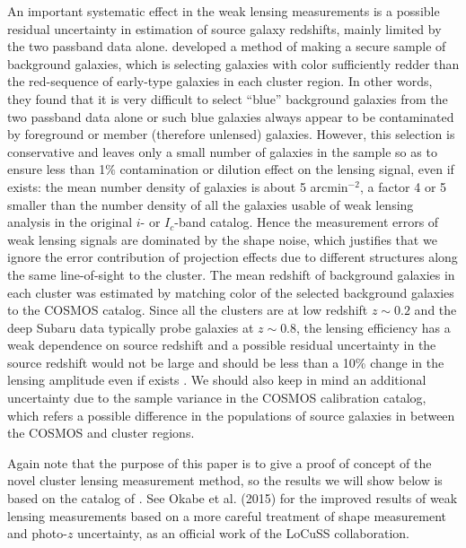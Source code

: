 \documentclass[iop, apj]{emulateapj}
\newcommand{\?}{\stackrel{?}{=}}
\begin{document}
An important systematic effect in the weak lensing measurements is a
possible residual uncertainty in estimation of source galaxy redshifts,
mainly limited by the two passband data alone. \citet{Okabeetal:13}
developed a method of making a secure sample of background galaxies,
which is selecting galaxies with color sufficiently redder than the
red-sequence of early-type galaxies in each cluster region. In other
words, they found that it is very difficult to select ``blue''
background galaxies from the two passband data alone or such blue
galaxies always appear to be contaminated by foreground or member
(therefore unlensed) galaxies.  However, this selection is conservative
and leaves only a small number of galaxies in the sample so as to ensure
less than 1$\%$ contamination or dilution effect on the lensing signal,
even if exists: the mean number density of galaxies is about 5
arcmin$^{-2}$, a factor 4 or 5 smaller than the number density of all
the galaxies usable of weak lensing analysis in the original $i$- or
$I_c$-band catalog. Hence the measurement errors of weak lensing signals
are dominated by the shape noise, which justifies that we ignore the
error contribution of projection effects due to different structures
along the same line-of-sight to the cluster. The mean redshift of
background galaxies in each cluster was estimated by matching color of
the selected background galaxies to the COSMOS catalog. Since all the
clusters are at low redshift $z\sim 0.2$ and the deep Subaru data
typically probe galaxies at $z\sim 0.8$, the lensing efficiency has a
weak dependence on source redshift and a possible residual uncertainty
in the source redshift would not be large and should be less than a 10\%
change in the lensing amplitude even if exists \citep[see \S~5.7.2
in][]{Okabeetal:10}. We should also keep in mind an additional
uncertainty due to the sample variance in the COSMOS calibration
catalog, which refers a possible difference in the populations of source
galaxies in between the COSMOS and cluster regions.


Again note that the purpose of this paper is to give a proof of concept
of the novel cluster lensing measurement method, so the results we will
show below is based on the catalog of \citet{Okabeetal:13}. See Okabe et
al. (2015) for the improved results of weak lensing measurements based
on a more careful treatment of shape measurement and photo-$z$
uncertainty, as an official work of the LoCuSS collaboration.
\end{document}
